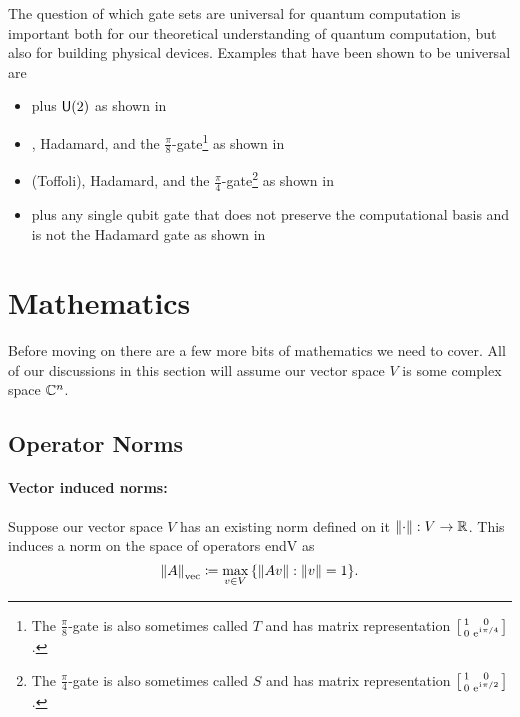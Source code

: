The question of which gate sets are universal for quantum computation is important both for our theoretical understanding of quantum computation, but also for building physical devices.
Examples that have been shown to be universal are
\begin{itemize}
    \item \CNOT{} plus $\mathsf{U} (2)$ as shown in~\cite{universal-cnot-u2}
    \item \CNOT{}, Hadamard, and the $\frac{\pi}{8}$-gate\footnote{The $\frac{\pi}{8}$-gate is also sometimes called $T$ and has matrix representation $\smqty[1 & 0 \\ 0 & \e^{\iu\pi/4}]$.} as shown in~\cite{universal-cnot-had-p8}
    \item \CCNOT{} (Toffoli), Hadamard, and the $\frac{\pi}{4}$-gate\footnote{The $\frac{\pi}{4}$-gate is also sometimes called $S$ and has matrix representation $\smqty[1 & 0 \\ 0 & \e^{\iu\pi/2}]$.} as shown in~\cite{bigkitaev}
    \item \CNOT{} plus any single qubit gate that does not preserve the computational basis and is not the Hadamard gate as shown in~\cite{universal-cnot-basis-change}
\end{itemize}

\section{Mathematics} %

Before moving on there are a few more bits of mathematics we need to cover.
All of our discussions in this section will assume our vector space $V$ is some complex space $\mathbb{C}^n$.

\subsection{Operator Norms}

\paragraph{Vector induced norms:}
Suppose our vector space $V$ has an existing norm defined on it $\norm{\cdot}: V \to \mathbb{R}$.
This induces a norm on the space of operators \gls{endV} as
\begin{equation}
    \norm{A}_\text{vec} \coloneqq \max_{v \in V}\qty{\norm{A v}: \norm{v} = 1}.
\end{equation}

